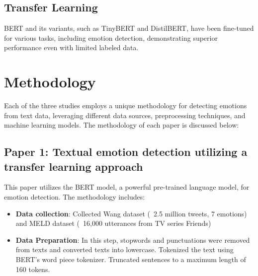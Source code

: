 \documentclass[12pt]{article} %
\begin{document}
\subsection{Transfer Learning}
BERT and its variants, such as TinyBERT and DistilBERT, have been fine-tuned for various tasks, including emotion detection, demonstrating superior performance even with limited labeled data\cite{devlin}.

\section{Methodology}

Each of the three studies employs a unique methodology for detecting emotions from text data, leveraging different data sources, preprocessing techniques, and machine learning models. The methodology of each paper is discussed below:

\subsection{Paper 1: Textual emotion detection utilizing a transfer learning approach}
This paper utilizes the BERT model, a powerful pre-trained language model, for emotion detection. The methodology includes:
\begin{itemize}
    \item \textbf{Data collection}:
    Collected Wang dataset (~2.5 million tweets, 7 emotions) and MELD dataset (~16,000 utterances from TV series Friends)
    
\end{itemize}

\begin{itemize}
    \item \textbf{Data Preparation}:
    In this step, stopwords and punctuations were removed from texts and converted texts into lowercase. Tokenized the text using BERT's word piece tokenizer. Truncated sentences to a maximum length of 160 tokens.
\end{itemize}
\end{document}
